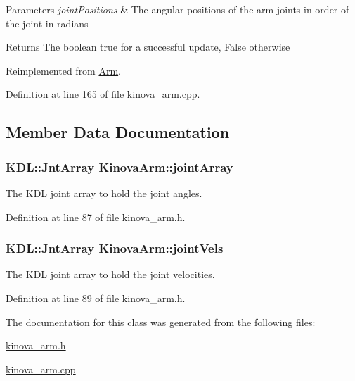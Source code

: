 \begin{DoxyParams}{Parameters}
{\em joint\+Positions} & The angular positions of the arm joints in order of the joint in radians \\
\hline
\end{DoxyParams}
\begin{DoxyReturn}{Returns}
The boolean true for a successful update, False otherwise 
\end{DoxyReturn}


Reimplemented from \hyperlink{class_arm_a9bfe3a3f230c8fa8a39f88cce2d6b597}{Arm}.



Definition at line 165 of file kinova\+\_\+arm.\+cpp.



\subsection{Member Data Documentation}
\subsubsection[{\texorpdfstring{joint\+Array}{jointArray}}]{\setlength{\rightskip}{0pt plus 5cm}K\+D\+L\+::\+Jnt\+Array Kinova\+Arm\+::joint\+Array}\hypertarget{class_kinova_arm_a47ddba255203039c2d7d3ceb48b2c4ac}{}\label{class_kinova_arm_a47ddba255203039c2d7d3ceb48b2c4ac}


The K\+DL joint array to hold the joint angles. 



Definition at line 87 of file kinova\+\_\+arm.\+h.

\subsubsection[{\texorpdfstring{joint\+Vels}{jointVels}}]{\setlength{\rightskip}{0pt plus 5cm}K\+D\+L\+::\+Jnt\+Array Kinova\+Arm\+::joint\+Vels}\hypertarget{class_kinova_arm_adeab92c27d6555029a30f5bcbba8bfab}{}\label{class_kinova_arm_adeab92c27d6555029a30f5bcbba8bfab}


The K\+DL joint array to hold the joint velocities. 



Definition at line 89 of file kinova\+\_\+arm.\+h.



The documentation for this class was generated from the following files\+:\begin{DoxyCompactItemize}
\item 
\hyperlink{kinova__arm_8h}{kinova\+\_\+arm.\+h}\item 
\hyperlink{kinova__arm_8cpp}{kinova\+\_\+arm.\+cpp}\end{DoxyCompactItemize}

